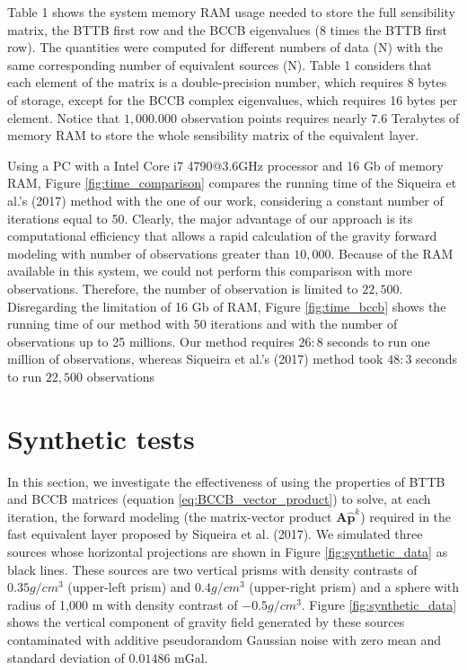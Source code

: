 \documentclass[paper]{geophysics}
\begin{document}
Table 1 shows the system memory RAM usage needed to store the full sensibility matrix, the BTTB first row and the BCCB eigenvalues ($8$ times the BTTB first row). The quantities were computed for different numbers of data (N) with the same corresponding number of equivalent sources (N). Table 1 considers that each element of the matrix is a double-precision number, which requires 8 bytes of storage, except for the BCCB complex eigenvalues, which requires 16 bytes per element. Notice that $1,000.000$ observation points requires nearly $7.6$ Terabytes of memory RAM to store the whole sensibility matrix of the equivalent layer.

Using a PC with a Intel Core i7 4790@3.6GHz processor and 16 Gb of memory RAM, Figure \ref{fig:time_comparison}  compares the running time  of the Siqueira et al.'s (2017) method with the one of our work, considering a constant number of iterations equal to 50. Clearly, the major advantage of our approach is its computational efficiency that allows a rapid calculation of the gravity forward modeling  with number of observations greater than $10,000$. Because of the RAM available in this system, we could not perform this comparison with more observations. Therefore, the number of observation is limited to $22,500$. Disregarding the limitation of 16 Gb of RAM, Figure \ref{fig:time_bccb} shows the running time of our method with 50 iterations and with the number of observations up to  25 millions. Our method requires $26:8$ seconds to run one million of observations, whereas  Siqueira et al.'s (2017) method took $48:3$ seconds to run $22,500$ observations


\section{Synthetic tests}
In this section, we  investigate the effectiveness of using the properties of BTTB and BCCB matrices (equation \ref{eq:BCCB_vector_product})  to solve, at each iteration, the forward modeling (the matrix-vector product $\mathbf{A} \hat{\mathbf{p}}^k$)  required in the fast equivalent layer proposed by Siqueira et al. (2017).  We simulated three sources whose horizontal projections are shown in Figure \ref{fig:synthetic_data} as black lines.  These sources are two vertical prisms with density contrasts of $0.35 g/cm^3$ (upper-left prism) and $0.4 g/cm^3$ (upper-right prism) and a sphere with radius of 1,000 m with density contrast of $-0.5 g/cm^3$. Figure \ref{fig:synthetic_data}  shows the vertical component of gravity field generated by these sources contaminated with additive pseudorandom Gaussian noise with zero mean and standard deviation of $0.01486$ mGal.
 
\end{document}
